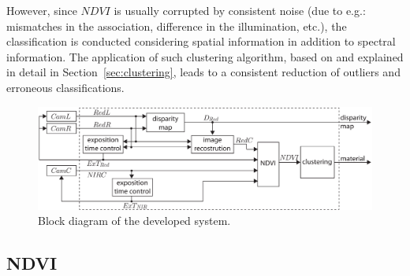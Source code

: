 \documentclass[letterpaper, 10pt, conference]{ieeeconf}      %
\begin{document}
However, since $NDVI$ is usually corrupted by consistent noise (due to e.g.: mismatches in the association, difference in the illumination, etc.), the classification is conducted considering spatial information in addition to spectral information.
The application of such clustering algorithm, based on \cite{1997_Wiemker} and explained in detail in Section~\ref{sec:clustering}, leads to a consistent reduction of outliers and erroneous classifications. 





\begin{figure}[t]
      \vspace{2mm}\centering
      \includegraphics[width=0.99\linewidth]{../images/diagram_ndvi_plus_disparity.pdf}\vspace{-1mm}
      \caption{Block diagram of the developed system.}
     \label{fig:Blockdiagram}
     \vspace{-7mm}
   \end{figure}
   









\subsection{NDVI}\label{sec:NDVI}
\end{document}
